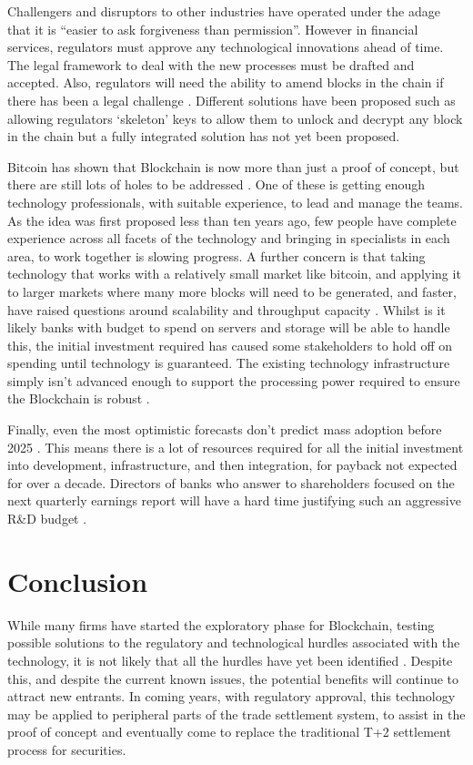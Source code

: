 \documentclass{article}
\begin{document}
Challengers and disruptors to other industries have operated under the adage that it is ``easier to ask forgiveness than permission''. However in financial services, regulators must approve any technological innovations ahead of time. The legal framework to deal with the new processes must be drafted and accepted. Also, regulators will need the ability to amend blocks in the chain if there has been a legal challenge \cite{WymanEuro}. Different solutions have been proposed such as allowing regulators `skeleton' keys to allow them to unlock and decrypt any block in the chain but a fully integrated solution has not yet been proposed.

Bitcoin has shown that Blockchain is now more than just a proof of concept, but there are still lots of holes to be addressed \cite{Deloitte}. One of these is getting enough technology professionals, with suitable experience, to lead and manage the teams. As the idea was first proposed less than ten years ago, few people have complete experience across all facets of the technology and bringing in specialists in each area, to work together is slowing progress. A further concern is that taking technology that works with a relatively small market like bitcoin, and applying it to larger markets where many more blocks will need to be generated, and faster, have raised questions around scalability and throughput capacity \cite{WymanEuro}. Whilst is it likely banks with budget to spend on servers and storage will be able to handle this, the initial investment required has caused some stakeholders to hold off on spending until technology is guaranteed. The existing technology infrastructure simply isn't advanced enough to support the processing power required to ensure the Blockchain is robust \cite{WymanEuro}.

Finally, even the most optimistic forecasts don't predict mass adoption before 2025 \cite{WymanEuro}. This means there is a lot of resources required for all the initial investment into development, infrastructure, and then integration, for payback not expected for over a decade. Directors of banks who answer to shareholders focused on the next quarterly earnings report will have a hard time justifying such an aggressive R\&D budget \cite{Accenture}.

\section{Conclusion}

While many firms have started the exploratory phase for Blockchain, testing possible solutions to the regulatory and technological hurdles associated with the technology, it is not likely that all the hurdles have yet been identified \cite{Accenture}. Despite this, and despite the current known issues, the potential benefits will continue to attract new entrants. In coming years, with regulatory approval, this technology may be applied to peripheral parts of the trade settlement system, to assist in the proof of concept and eventually come to replace the traditional T+2 settlement process for securities.
\end{document}
